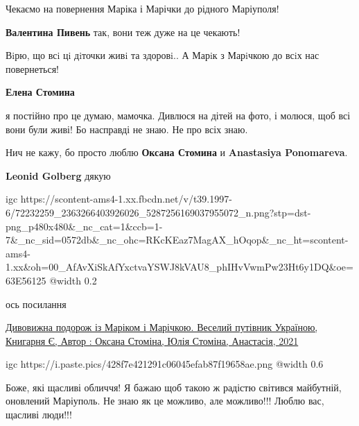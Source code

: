  
 
 
 
 

\qqSecCmt


Чекаємо на повернення Маріка і Марічки до рідного Маріуполя! 🙏🙏🙏🥰😊

\textbf{Валентина Пивень} так, вони теж дуже на це чекають!


Вiрю, що всi цi дiточки живi та здоровi.. А Марiк з Марiчкою до всiх нас повернеться!

\textbf{Елена Стомина} 

я постійно про це думаю, мамочка. Дивлюся на дітей на фото, і молюся, щоб всі
вони були живі! Бо насправді не знаю. Не про всіх знаю.


Нич не кажу, бо просто люблю \textbf{Оксана Стомина} и \textbf{Anastasiya Ponomareva}.

\textbf{Leonid Golberg} дякую

\ifcmt
  igc https://scontent-ams4-1.xx.fbcdn.net/v/t39.1997-6/72232259_2363266403926026_5287256169037955072_n.png?stp=dst-png_p480x480&_nc_cat=1&ccb=1-7&_nc_sid=0572db&_nc_ohc=RKcKEaz7MagAX_hOqop&_nc_ht=scontent-ams4-1.xx&oh=00_AfAvXiSkAfYxctvaYSWJ8kVAU8_phIHvVwmPw23Ht6y1DQ&oe=63E56125
	@width 0.2
\fi


ось посилання

\href{https://book-ye.com.ua/catalog/rozvyvalni-knyzhky/dyvovyzhna-podorozh-iz-marikom-i-marichkoyu-veselyj-putivnyk-ukrayinoyu/}{%
Дивовижна подорож із Маріком і Марічкою. Веселий путівник Україною, %
Книгарня Є,%
Автор : Оксана Стоміна, Юлія Стоміна, Анастасія, %
2021%
}

\ifcmt
  igc https://i.paste.pics/428f7e421291c06045efab87f19658ae.png
	@width 0.6
\fi


Боже, які щасливі обличчя! Я бажаю щоб такою ж радістю світився майбутній,
оновлений Маріуполь. Не знаю як це можливо, але можливо!!! Люблю вас, щасливі
люди!!!

